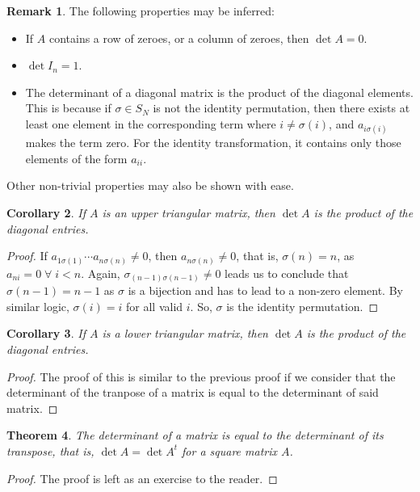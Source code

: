 \documentclass[15pt,a4paper]{book}
\newtheorem{theorem}{Theorem}[chapter]
\newtheorem{corollary}[theorem]{Corollary}
\theoremstyle{definition}
\newtheorem{remark}[theorem]{Remark}
\begin{document}
\begin{remark}
    The following properties may be inferred:
    \begin{itemize}
        \item If $A$ contains a row of zeroes, or a column of zeroes, then $\det{A} = 0$.
        \item $\det{I_{n}} = 1$.
        \item The determinant of a diagonal matrix is the product of the diagonal elements. This is because if $\sigma \in S_{N}$ is not the identity permutation, then there exists at least one element in the corresponding term where $i \neq \sigma(i)$, and $a_{i \sigma(i)}$ makes the term zero. For the identity transformation, it contains only those elements of the form $a_{ii}$.
    \end{itemize}
\end{remark}

Other non-trivial properties may also be shown with ease.

\begin{corollary}
    If $A$ is an upper triangular matrix, then $\det{A}$ is the product of the diagonal entries.
\end{corollary}
\begin{proof}
    If $a_{1 \sigma(1)} \cdots a_{n \sigma(n)} \neq 0$, then $a_{n \sigma(n)} \neq 0$, that is, $\sigma(n) = n$, as $a_{ni} = 0 \; \forall \; i < n$. Again, $\sigma_{(n-1) \sigma(n-1)} \neq 0$ leads us to conclude that $\sigma(n-1) = n-1$ as $\sigma$ is a bijection and has to lead to a non-zero element. By similar logic, $\sigma(i) = i$ for all valid $i$. So, $\sigma$ is the identity permutation.
\end{proof}
\begin{corollary}
    If $A$ is a lower triangular matrix, then $\det{A}$ is the product of the diagonal entries.
\end{corollary}
\begin{proof}
    The proof of this is similar to the previous proof if we consider that the determinant of the tranpose of a matrix is equal to the determinant of said matrix.
\end{proof}

\begin{theorem}
    The determinant of a matrix is equal to the determinant of its transpose, that is, $\det{A} = \det{A^{t}}$ for a square matrix $A$.
\end{theorem}
\begin{proof}
    The proof is left as an exercise to the reader.
\end{proof}
\end{document}
